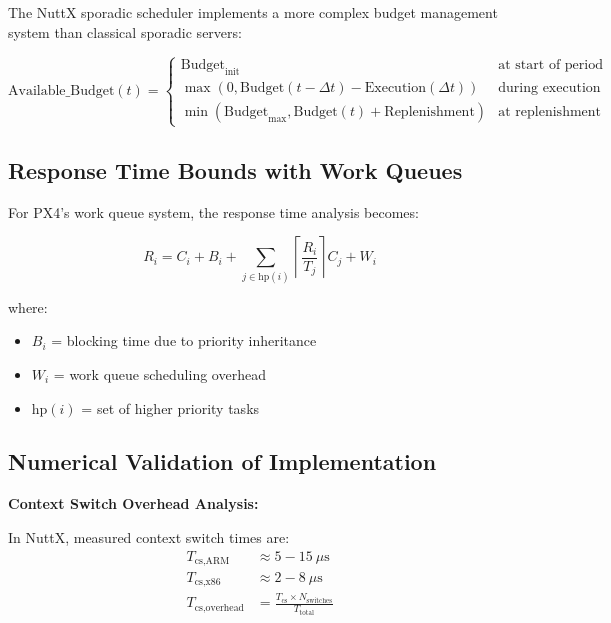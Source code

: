 \documentclass[12pt,a4paper]{article}
\begin{document}
The NuttX sporadic scheduler implements a more complex budget management system than classical sporadic servers:

\begin{equation}
\text{Available\_Budget}(t) = \begin{cases}
\text{Budget}_{\text{init}} & \text{at start of period} \\
\max(0, \text{Budget}(t-\Delta t) - \text{Execution}(\Delta t)) & \text{during execution} \\
\min(\text{Budget}_{\max}, \text{Budget}(t) + \text{Replenishment}) & \text{at replenishment}
\end{cases}
\end{equation}

\subsection{Response Time Bounds with Work Queues}

For PX4's work queue system, the response time analysis becomes:

\begin{equation}
R_i = C_i + B_i + \sum_{j \in \text{hp}(i)} \left\lceil \frac{R_i}{T_j} \right\rceil C_j + W_i
\end{equation}

where:
\begin{itemize}
\item $B_i$ = blocking time due to priority inheritance
\item $W_i$ = work queue scheduling overhead
\item $\text{hp}(i)$ = set of higher priority tasks
\end{itemize}

\subsection{Numerical Validation of Implementation}

\textbf{Context Switch Overhead Analysis:}

In NuttX, measured context switch times are:
\begin{align}
T_{\text{cs,ARM}} &\approx 5-15\ \mu\text{s} \\
T_{\text{cs,x86}} &\approx 2-8\ \mu\text{s} \\
T_{\text{cs,overhead}} &= \frac{T_{\text{cs}} \times N_{\text{switches}}}{T_{\text{total}}}
\end{align}
\end{document}
